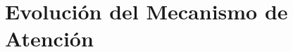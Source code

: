 \documentclass[aspectratio=169]{beamer}
\begin{document}

\section{Evolución del Mecanismo de Atención}
\end{document}
